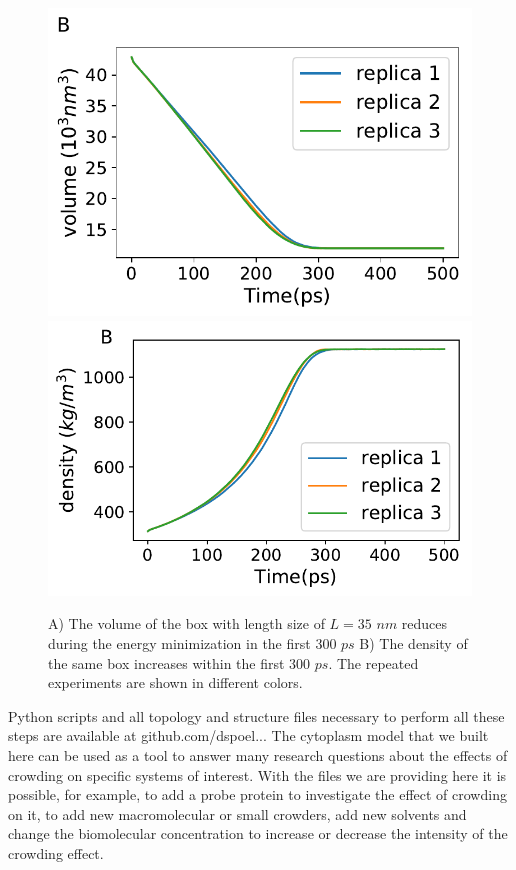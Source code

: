 \documentclass[journal=jacsat,manuscript=article]{achemso}
\begin{document}
\begin{figure}
\includegraphics[scale=0.7]{shrinking_volume.pdf} 
\includegraphics[scale=0.7]{shrinking_density.pdf} 
\caption{A) The volume of the box with length size of $L=35 \,\, nm$ reduces during the energy minimization in the first $300 \,\, ps$ B) The density of the same box increases within the first $300\,\, ps$. The repeated experiments are shown in different colors. }
\end{figure}



Python scripts and all topology and structure files necessary to perform all these steps are available at github.com/dspoel... The cytoplasm model that we built here can be used as a tool to answer many research questions about the effects of crowding on specific systems of interest. With the files we are providing here it is possible, for example, to add a probe protein to investigate the effect of crowding on it, to add new macromolecular or small crowders, add new solvents and change the biomolecular concentration to increase or decrease the intensity of the crowding effect.
 
\end{document}
